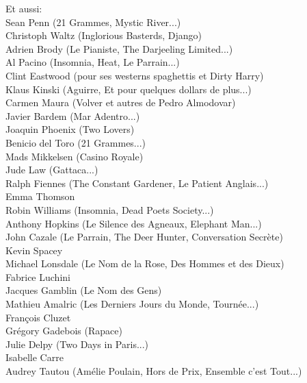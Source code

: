 Et aussi:\\
Sean Penn (21 Grammes, Mystic River...)\\
Christoph Waltz (Inglorious Basterds, Django) \\
Adrien Brody (Le Pianiste, The Darjeeling Limited...)\\
Al Pacino (Insomnia, Heat, Le Parrain...)\\
Clint Eastwood (pour ses westerns spaghettis et Dirty Harry)\\
Klaus Kinski (Aguirre, Et pour quelques dollars de plus...)\\
Carmen Maura (Volver et autres de Pedro Almodovar)\\
Javier Bardem (Mar Adentro...)\\
Joaquin Phoenix (Two Lovers)\\
Benicio del Toro (21 Grammes...)\\
Mads Mikkelsen (Casino Royale)\\
Jude Law (Gattaca...)\\
Ralph Fiennes (The Constant Gardener, Le Patient Anglais...)\\
Emma Thomson\\
Robin Williams (Insomnia, Dead Poets Society...)\\
Anthony Hopkins (Le Silence des Agneaux, Elephant Man...)\\
John Cazale (Le Parrain, The Deer Hunter, Conversation Secrète)\\
Kevin Spacey\\
Michael Lonsdale (Le Nom de la Rose, Des Hommes et des Dieux)\\

Fabrice Luchini\\
Jacques Gamblin (Le Nom des Gens)\\
Mathieu Amalric (Les Derniers Jours du Monde, Tournée...)\\
François Cluzet\\
Grégory Gadebois (Rapace)\\
Julie Delpy (Two Days in Paris...)\\
Isabelle Carre\\
Audrey Tautou (Amélie Poulain, Hors de Prix, Ensemble c'est Tout...)\\

